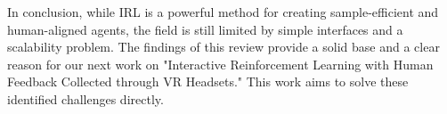 \documentclass[rnd]{mas_proposal}
\begin{document}
In conclusion, while IRL is a powerful method for creating sample-efficient and human-aligned agents, the field is still limited by simple interfaces and a scalability problem. The findings of this review provide a solid base and a clear reason for our next work on "Interactive Reinforcement Learning with Human Feedback Collected through VR Headsets." This work aims to solve these identified challenges directly.

\nocite{*}

\end{document}

